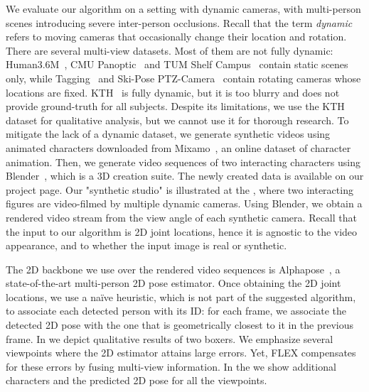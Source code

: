 We evaluate our algorithm on
a setting with dynamic cameras, with multi-person scenes introducing
severe inter-person occlusions.
Recall that the term \emph{dynamic} refers to moving cameras that occasionally change their location and rotation.
There are several multi-view datasets. Most of them are not fully dynamic: Human3.6M~\cite{h36m_pami,IonescuSminchisescu11}, CMU Panoptic~\cite{CMU:mocap} and TUM Shelf  Campus~\cite{campus_shelf} contain static scenes only, while Tagging~\cite{tagging_dataset} and Ski-Pose PTZ-Camera~\cite{ski_ptz} contain  rotating cameras whose locations are fixed. KTH~\cite{footballDS} is fully dynamic, but it is too blurry and does not provide ground-truth for all subjects.
Despite its limitations, we use the KTH dataset for qualitative analysis, but we cannot use it for thorough research.
To mitigate the lack of a dynamic dataset, we generate synthetic videos using animated characters downloaded from Mixamo~\cite{mixamo}, an online dataset of character animation. Then, we generate video sequences of two interacting characters using Blender~\cite{blender}, which is a 3D creation suite. The newly created data is available on our project page.
Our "synthetic studio" is illustrated at the \fi, where two interacting figures are video-filmed by multiple dynamic cameras.
Using Blender, we obtain a rendered video stream from the view angle of each synthetic camera. 
Recall that the input to our algorithm is 2D joint locations, hence it is agnostic to the video appearance, and to whether the input image is real or synthetic.

The 2D backbone we use over the rendered video sequences is Alphapose~\cite{alphapose}, a state-of-the-art multi-person 2D pose estimator.
Once obtaining the 2D joint locations, we use a na\"ive heuristic, which is not part of the suggested algorithm, to associate each detected person with its ID: for each frame, we associate the detected 2D pose with the one that is geometrically closest to it in the previous frame. 
In  we depict qualitative results of two boxers. We emphasize several viewpoints where the 2D estimator attains large errors. Yet, FLEX compensates for these errors by fusing multi-view information. In the \fi we show additional characters and the predicted 2D pose for all the viewpoints.


